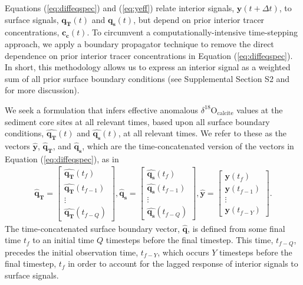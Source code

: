 \documentclass[draft]{agujournal2019}
\begin{document}
  Equations (\ref{eq:diffeqspec}) and (\ref{eq:yeff}) relate interior signals,
  $\mathbf{y}(t+\Delta t)$, to surface signals,
  $\mathbf{q_{T}}(t)$ and $\mathbf{q_{s}}(t)$,
  but depend on
  prior interior tracer concentrations, $\mathbf{c_{c}}(t)$.
To circumvent a computationally-intensive time-stepping approach,
we apply a boundary propagator technique to remove the direct dependence on
prior interior
tracer concentrations in Equation (\ref{eq:diffeqspec}). In short,
  this methodology allows us to express an interior signal as a weighted sum of
all prior surface boundary conditions (see
Supplemental Section S2 %
and  for more discussion).

We seek a formulation that
infers effective anomalous $\delta^{18}\mathrm{O}_{\mathrm{calcite}}$ values at the
sediment core sites at all relevant times, based upon all surface
boundary conditions, $\mathbf{\hat{q_{T}}}(t)$ and $\mathbf{\hat{q_{s}}}(t)$, at
all relevant times. We refer to these as the vectors
$\mathbf{\hat{y}}$, $\mathbf{\hat{q}_{T}}$, and
$\mathbf{\hat{q}_{s}}$, which are the time-concatenated version of the
vectors in Equation (\ref{eq:diffeqspec}), as in
\begin{align}
  \label{eq:expand} 
\mathbf{\hat{q}_{T}} = \begin{bmatrix}
                         \mathbf{\hat{q_{T}}}(t_{f})\\
                         \mathbf{\hat{q_{T}}}(t_{f-1})\\
                         \vdots \\
                         \mathbf{\hat{q_{T}}}(t_{f-Q})
                        \end{bmatrix},
\mathbf{\hat{q}_{s}} = \begin{bmatrix}
                         \mathbf{\hat{q_{s}}}(t_{f})\\
                         \mathbf{\hat{q_{s}}}(t_{f-1})\\
                         \vdots \\
                         \mathbf{\hat{q_{s}}}(t_{f - Q})
                        \end{bmatrix},
\mathbf{\hat{y}} = \begin{bmatrix}
                         \mathbf{y}(t_{f})\\
                         \mathbf{y}(t_{f-1})\\
                         \vdots \\
                         \mathbf{y}(t_{f-Y})
                         \end{bmatrix}.                         
\end{align}
The time-concatenated surface boundary vector,
$\mathbf{\hat{q}}$, is defined from some
final time $t_{f}$ to an initial time $Q$ timesteps before the final timestep.
This time, $t_{f-Q}$, precedes the initial observation time, $t_{f-Y}$, which occurs $Y$
timesteps before the final timestep, $t_{f}$ in order to account for the
lagged response of interior
signals to surface signals. 
\end{document}
